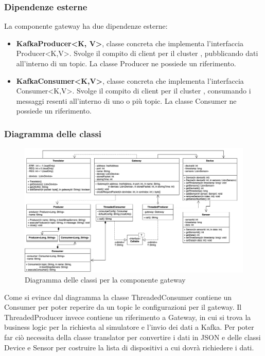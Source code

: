 	\subsubsection{Dipendenze esterne}	
		La componente gateway ha due dipendenze esterne: 
			\begin{itemize}
				\item \textbf{KafkaProducer<K, V>}, classe concreta che implementa l'interfaccia Producer<K,V>. Svolge il compito di client per il cluster , pubblicando dati all'interno di un topic. La classe Producer ne possiede un riferimento.
				\item \textbf{KafkaConsumer<K,V>}, classe concreta che implementa l'interfaccia Consumer<K,V>. Svolge il compito di client per il cluster , consumando i messaggi resenti all'interno di uno o più topic. La classe Consumer ne possiede un riferimento.
			\end{itemize}	
		\newpage		

	\begin{landscape}
		\subsubsection{Diagramma delle classi}%
		  	\begin{figure}[H]
				\centering
				\includegraphics[scale=0.499]{res/images/GATEWAY/ClassiGateway.png}
				\caption{Diagramma delle classi per la componente gateway}
				\label{Diagramma 2}
			\end{figure}
	Come si evince dal diagramma la classe ThreadedConsumer contiene un Consumer per poter reperire da un topic  le configurazioni per il gateway.
	\newline
	Il ThreadedProducer invece contiene un riferimento a Gateway, in cui si trova la business logic per la richiesta al simulatore e l'invio dei dati a Kafka. Per poter far ciò necessita della classe translator per convertire i dati in JSON e delle classi Device e Sensor per costruire la lista di dispositivi a cui dovrà richiedere i dati.
	\end{landscape}
		
